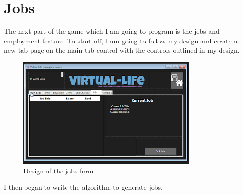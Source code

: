 \section{Jobs}
The next part of the game which I am going to program is the jobs and employment feature.
To start off, I am going to follow my design and create a new tab page on the main tab control with the controls outlined in my design.
\begin{figure}[H]
    \centering
    \includegraphics[width=0.8\textwidth]{images/implementation/jobs1.png}
    \caption{Design of the jobs form}
    \label{fig:implementation-jobs1}
\end{figure}
\noindent I then began to write the algorithm to generate jobs.
